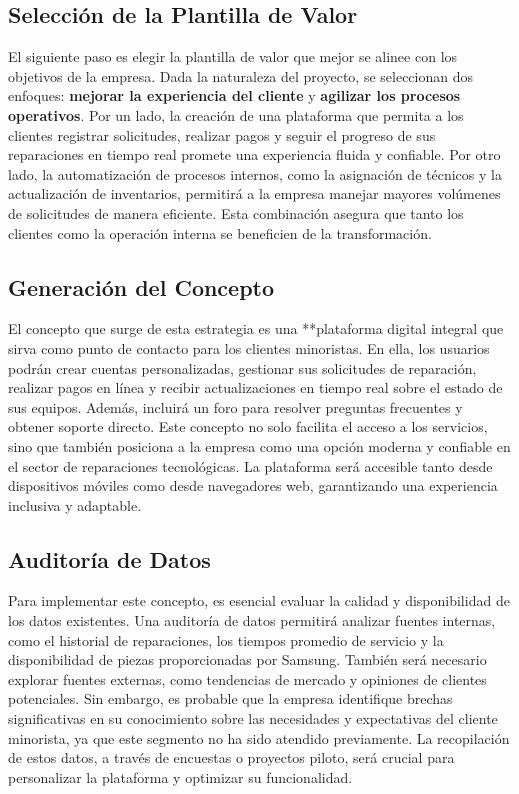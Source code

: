 	\subsection{Selección de la Plantilla de Valor}

	El siguiente paso es elegir la plantilla de valor que mejor se alinee con los
	objetivos de la empresa. Dada la naturaleza del proyecto, se seleccionan dos
	enfoques: \textbf{mejorar la experiencia del cliente} y \textbf{agilizar los
	procesos operativos}. Por un lado, la creación de una plataforma que permita a
	los clientes registrar solicitudes, realizar pagos y seguir el progreso de sus
	reparaciones en tiempo real promete una experiencia fluida y confiable. Por otro
	lado, la automatización de procesos internos, como la asignación de técnicos y
	la actualización de inventarios, permitirá a la empresa manejar mayores
	volúmenes de solicitudes de manera eficiente. Esta combinación asegura que tanto
	los clientes como la operación interna se beneficien de la transformación.

	\subsection{Generación del Concepto}

	El concepto que surge de esta estrategia es una **plataforma digital integral
	que sirva como punto de contacto para los clientes minoristas. En ella, los
	usuarios podrán crear cuentas personalizadas, gestionar sus solicitudes de reparación,
	realizar pagos en línea y recibir actualizaciones en tiempo real sobre el
	estado de sus equipos. Además, incluirá un foro para resolver preguntas
	frecuentes y obtener soporte directo. Este concepto no solo facilita el acceso
	a los servicios, sino que también posiciona a la empresa como una opción
	moderna y confiable en el sector de reparaciones tecnológicas. La plataforma será
	accesible tanto desde dispositivos móviles como desde navegadores web,
	garantizando una experiencia inclusiva y adaptable.

	\subsection{Auditoría de Datos}

	Para implementar este concepto, es esencial evaluar la calidad y
	disponibilidad de los datos existentes. Una auditoría de datos permitirá analizar
	fuentes internas, como el historial de reparaciones, los tiempos promedio de servicio
	y la disponibilidad de piezas proporcionadas por Samsung. También será
	necesario explorar fuentes externas, como tendencias de mercado y opiniones de
	clientes potenciales. Sin embargo, es probable que la empresa identifique brechas
	significativas en su conocimiento sobre las necesidades y expectativas del cliente
	minorista, ya que este segmento no ha sido atendido previamente. La recopilación
	de estos datos, a través de encuestas o proyectos piloto, será crucial para personalizar
	la plataforma y optimizar su funcionalidad.

